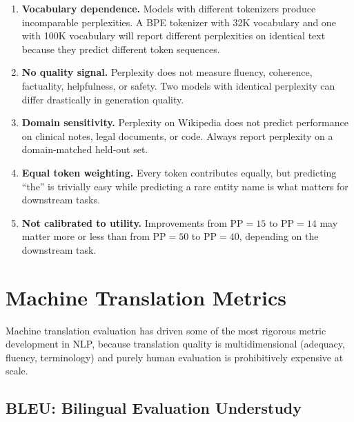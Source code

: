 \begin{enumerate}[label=\textbf{\arabic*.}]
    \item \textbf{Vocabulary dependence.}  Models with different tokenizers
          produce incomparable perplexities.  A BPE tokenizer with 32K vocabulary
          and one with 100K vocabulary will report different perplexities on
          identical text because they predict different token sequences.

    \item \textbf{No quality signal.}  Perplexity does not measure fluency,
          coherence, factuality, helpfulness, or safety.  Two models with
          identical perplexity can differ drastically in generation quality.

    \item \textbf{Domain sensitivity.}  Perplexity on Wikipedia does not predict
          performance on clinical notes, legal documents, or code.  Always report
          perplexity on a domain-matched held-out set.

    \item \textbf{Equal token weighting.}  Every token contributes equally, but
          predicting ``the'' is trivially easy while predicting a rare entity
          name is what matters for downstream tasks.

    \item \textbf{Not calibrated to utility.}  Improvements from $\text{PP}=15$ to
          $\text{PP}=14$ may matter more or less than from $\text{PP}=50$ to
          $\text{PP}=40$, depending on the downstream task.
\end{enumerate}

\section{Machine Translation Metrics}
\label{sec:mt_metrics}

Machine translation evaluation has driven some of the most rigorous metric
development in NLP, because translation quality is multidimensional (adequacy,
fluency, terminology) and purely human evaluation is prohibitively expensive at
scale.

\subsection{BLEU: Bilingual Evaluation Understudy}
\label{sec:bleu}

